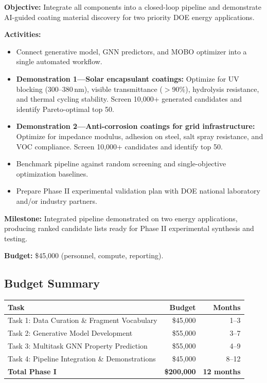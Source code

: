 \documentclass[11pt,letterpaper]{article}
\begin{document}
\textbf{Objective:} Integrate all components into a closed-loop pipeline and demonstrate AI-guided coating material discovery for two priority DOE energy applications.

\textbf{Activities:}
\begin{itemize}[noitemsep]
  \item Connect generative model, GNN predictors, and MOBO optimizer into a single automated workflow.
  \item \textbf{Demonstration 1---Solar encapsulant coatings:} Optimize for UV blocking (300--380\,nm), visible transmittance ($>$90\%), hydrolysis resistance, and thermal cycling stability. Screen 10,000+ generated candidates and identify Pareto-optimal top 50.
  \item \textbf{Demonstration 2---Anti-corrosion coatings for grid infrastructure:} Optimize for impedance modulus, adhesion on steel, salt spray resistance, and VOC compliance. Screen 10,000+ candidates and identify top 50.
  \item Benchmark pipeline against random screening and single-objective optimization baselines.
  \item Prepare Phase II experimental validation plan with DOE national laboratory and/or industry partners.
\end{itemize}

\textbf{Milestone:} Integrated pipeline demonstrated on two energy applications, producing ranked candidate lists ready for Phase II experimental synthesis and testing.

\textbf{Budget:} \$45,000 (personnel, compute, reporting).

\subsection{Budget Summary}

\begin{center}
\begin{tabular}{lrr}
\toprule
\textbf{Task} & \textbf{Budget} & \textbf{Months} \\
\midrule
Task 1: Data Curation \& Fragment Vocabulary & \$45,000 & 1--3 \\
Task 2: Generative Model Development & \$55,000 & 3--7 \\
Task 3: Multitask GNN Property Prediction & \$55,000 & 4--9 \\
Task 4: Pipeline Integration \& Demonstrations & \$45,000 & 8--12 \\
\midrule
\textbf{Total Phase I} & \textbf{\$200,000} & \textbf{12 months} \\
\bottomrule
\end{tabular}
\end{center}
\end{document}
